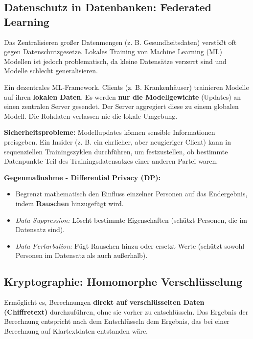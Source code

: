 \documentclass[
../../css_summary.tex,
]{subfiles}
\begin{document}
\subsection{Datenschutz in Datenbanken: Federated Learning}

Das Zentralisieren großer Datenmengen (z. B. Gesundheitsdaten) verstößt oft gegen Datenschutzgesetze. Lokales Training von Machine Learning (ML) Modellen ist jedoch problematisch, da kleine Datensätze verzerrt sind und Modelle schlecht generalisieren.

\begin{defbox}
  Ein dezentrales ML-Framework. Clients (z. B. Krankenhäuser) trainieren Modelle auf ihren \textbf{lokalen Daten}. Es werden \textbf{nur die Modellgewichte} (Updates) an einen zentralen Server gesendet. Der Server aggregiert diese zu einem globalen Modell. Die Rohdaten verlassen nie die lokale Umgebung.
\end{defbox}

\textbf{Sicherheitsprobleme:}
Modellupdates können sensible Informationen preisgeben. Ein Insider (z. B. ein ehrlicher, aber neugieriger Client) kann in sequenziellen Trainingszyklen  durchführen, um festzustellen, ob bestimmte Datenpunkte Teil des Trainingsdatensatzes einer anderen Partei waren.

\textbf{Gegenmaßnahme - Differential Privacy (DP):}
\begin{itemize}
  \item Begrenzt mathematisch den Einfluss einzelner Personen auf das Endergebnis, indem \textbf{Rauschen} hinzugefügt wird.
  \item \textit{Data Suppression:} Löscht bestimmte Eigenschaften (schützt Personen, die im Datensatz sind).
  \item \textit{Data Perturbation:} Fügt Rauschen hinzu oder ersetzt Werte (schützt sowohl Personen im Datensatz als auch außerhalb).
\end{itemize}

\subsection{Kryptographie: Homomorphe Verschlüsselung}

\begin{defbox}
  Ermöglicht es, Berechnungen \textbf{direkt auf verschlüsselten Daten (Chiffretext)} durchzuführen, ohne sie vorher zu entschlüsseln. Das Ergebnis der Berechnung entspricht nach dem Entschlüsseln dem Ergebnis, das bei einer Berechnung auf Klartextdaten entstanden wäre.
\end{defbox}
% 
\end{document}
